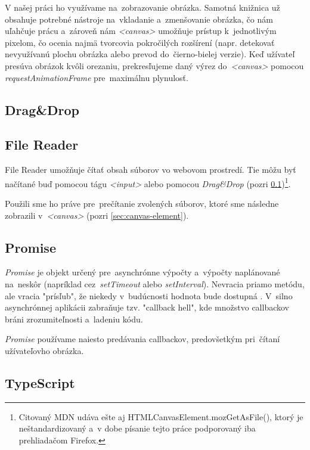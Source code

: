 V našej práci ho využívame na~zobrazovanie obrázka. Samotná knižnica už obsahuje potrebné nástroje na~vkladanie a~zmenšovanie obrázka, čo nám uľahčuje prácu a~zároveň nám \emph{<canvas>} umožňuje prístup k~jednotlivým pixelom, čo ocenia najmä tvorcovia pokročilých rozšírení (napr. detekovať nevyužívanú plochu obrázka alebo prevod do~čierno-bielej verzie). Keď užívateľ presúva obrázok kvôli orezaniu, prekresľujeme daný výrez do~\emph{<canvas>} pomocou \emph{requestAnimationFrame}\cite{MDN_RequestAnimationFrame} pre~maximálnu plynulosť.

\subsection{Drag\&Drop}
\label{sec:drag-n-drop}

\subsection{File Reader}
\label{sec:file-reader}

File Reader umožňuje čítať obsah súborov vo webovom prostredí. Tie môžu byť načítané buď pomocou tágu \emph{<input>} alebo pomocou \emph{Drag\&Drop} (pozri \ref{sec:drag-n-drop})\cite{MDN_FileReader}\footnote{Citovaný MDN udáva ešte aj HTMLCanvasElement.mozGetAsFile(), ktorý je neštandardizovaný a~v dobe písanie tejto práce podporovaný iba prehliadačom Firefox.}.

Použili sme ho práve pre~prečítanie zvolených súborov, ktoré sme následne zobrazili v~\emph{<canvas>} (pozri \ref{sec:canvas-element}).

\subsection{Promise}

\emph{Promise} je objekt určený pre~asynchrónne výpočty a~výpočty naplánované na~neskôr (napríklad cez~\emph{setTimeout} alebo \emph{setInterval}). Nevracia priamo metódu, ale vracia "prísľub", že niekedy v~budúcnosti hodnota bude dostupná \cite{MDN_Promise}. V~silno asynchrónnej aplikácii zabraňuje tzv. "callback hell", kde množstvo callbackov bráni zrozumiteľnosti a~ladeniu kódu.

\emph{Promise} používame naiesto predávania callbackov, predovšetkým pri~čítaní užívateľovho obrázka.

\subsection{TypeScript}

